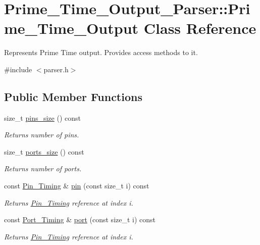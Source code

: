 \hypertarget{classPrime__Time__Output__Parser_1_1Prime__Time__Output}{\section{Prime\-\_\-\-Time\-\_\-\-Output\-\_\-\-Parser\-:\-:Prime\-\_\-\-Time\-\_\-\-Output Class Reference}
\label{classPrime__Time__Output__Parser_1_1Prime__Time__Output}
}


Represents Prime Time output. Provides access methods to it.  




{\ttfamily \#include $<$parser.\-h$>$}

\subsection*{Public Member Functions}
\begin{DoxyCompactItemize}
\item 
size\-\_\-t \hyperlink{classPrime__Time__Output__Parser_1_1Prime__Time__Output_af89e7f909821e56d0e89ae62cebc5b81}{pins\-\_\-size} () const 
\begin{DoxyCompactList}\small\item\em Returns number of pins. \end{DoxyCompactList}\item 
size\-\_\-t \hyperlink{classPrime__Time__Output__Parser_1_1Prime__Time__Output_a6fdf8bbe0ea6ecdcdecec62e0922625f}{ports\-\_\-size} () const 
\begin{DoxyCompactList}\small\item\em Returns number of ports. \end{DoxyCompactList}\item 
const \hyperlink{structPrime__Time__Output__Parser_1_1Pin__Timing}{Pin\-\_\-\-Timing} \& \hyperlink{classPrime__Time__Output__Parser_1_1Prime__Time__Output_adfa3dff9af20ebb0872d4c775b3eeecc}{pin} (const size\-\_\-t i) const 
\begin{DoxyCompactList}\small\item\em Returns \hyperlink{structPrime__Time__Output__Parser_1_1Pin__Timing}{Pin\-\_\-\-Timing} reference at index i. \end{DoxyCompactList}\item 
const \hyperlink{structPrime__Time__Output__Parser_1_1Port__Timing}{Port\-\_\-\-Timing} \& \hyperlink{classPrime__Time__Output__Parser_1_1Prime__Time__Output_a36d4fa1cf4175cce9bac2fb27ea98f72}{port} (const size\-\_\-t i) const 
\begin{DoxyCompactList}\small\item\em Returns \hyperlink{structPrime__Time__Output__Parser_1_1Pin__Timing}{Pin\-\_\-\-Timing} reference at index i. \end{DoxyCompactList}\end{DoxyCompactItemize}
